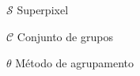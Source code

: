 \begin{simbolos}



\item[$\mathcal{S}$] Superpixel
\item[$\mathcal{C}$] Conjunto de grupos
\item[$\theta$] Método de agrupamento






\end{simbolos}